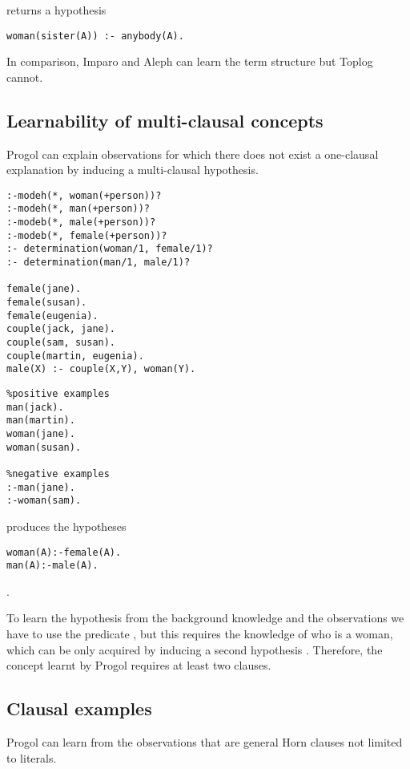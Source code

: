 returns a hypothesis
\begin{lstlisting}
woman(sister(A)) :- anybody(A).
\end{lstlisting}
In comparison, Imparo and Aleph can learn the term structure but Toplog cannot.

\subsection{Learnability of multi-clausal concepts}
Progol can explain observations for which there does not exist a one-clausal explanation by inducing a multi-clausal hypothesis.

\begin{minipage}[t]{.60\textwidth}
\begin{lstlisting}
:-modeh(*, woman(+person))?
:-modeh(*, man(+person))?
:-modeb(*, male(+person))?
:-modeb(*, female(+person))?
:- determination(woman/1, female/1)?
:- determination(man/1, male/1)?

female(jane).
female(susan).
female(eugenia).
couple(jack, jane).
couple(sam, susan).
couple(martin, eugenia).
male(X) :- couple(X,Y), woman(Y).\end{lstlisting}
\end{minipage}
\begin{minipage}[t]{.20\textwidth}
\begin{lstlisting}
%positive examples
man(jack).
man(martin).
woman(jane).
woman(susan).

%negative examples
:-man(jane).
:-woman(sam).
\end{lstlisting}
\end{minipage}

produces the hypotheses
\begin{lstlisting}
woman(A):-female(A).
man(A):-male(A).
\end{lstlisting}.

To learn the hypothesis  from the background knowledge and the observations we have to use the predicate , but this requires the knowledge of who is a woman, which can be only acquired by inducing a second hypothesis . Therefore, the concept learnt by Progol requires at least two clauses.

\subsection{Clausal examples}\label{progol_clausal_examples}
Progol can learn from the observations that are general Horn clauses not limited to literals.

